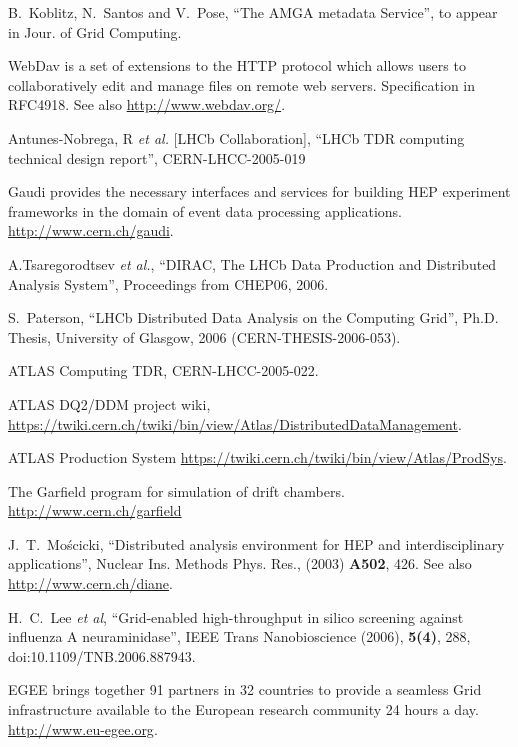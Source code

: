 \documentclass{elsart}
\begin{document}
\begin{thebibliography}{00}
 B.~Koblitz, N.~Santos and V.~Pose, ``The AMGA metadata
  Service'', to appear in Jour. of Grid Computing.

 WebDav is a set of extensions to the HTTP protocol which
  allows users to collaboratively edit and manage files on remote web servers.
  Specification in RFC4918. See also \url{http://www.webdav.org/}.

    Antunes-Nobrega, R {\it et al.} [LHCb Collaboration],
  ``LHCb TDR computing technical design report'', CERN-LHCC-2005-019

  Gaudi provides the necessary interfaces and services for building HEP
  experiment frameworks in the domain of event data processing
  applications. \url{http://www.cern.ch/gaudi}.

  A.Tsaregorodtsev {\it et al.}, ``DIRAC, The LHCb Data Production and
  Distributed Analysis System'', Proceedings from CHEP06, 2006.

  S.~Paterson, ``LHCb Distributed Data Analysis on the Computing Grid'', Ph.D.
  Thesis, University of Glasgow, 2006 (CERN-THESIS-2006-053).

  ATLAS Computing TDR, CERN-LHCC-2005-022.

  ATLAS DQ2/DDM project wiki, 
  \url{https://twiki.cern.ch/twiki/bin/view/Atlas/DistributedDataManagement}.

  ATLAS Production System
  \url{https://twiki.cern.ch/twiki/bin/view/Atlas/ProdSys}.

  The Garfield program for simulation of drift chambers.
  \url{http://www.cern.ch/garfield}

 J.~T.~Mo{\'s}cicki, ``Distributed analysis environment for
  HEP and interdisciplinary applications'', Nuclear Ins. Methods Phys. Res.,
  (2003) {\bf A502}, 426. See also
  \url{http://www.cern.ch/diane}.

  H.~C.~Lee {\it et al}, ``Grid-enabled high-throughput in silico screening
  against influenza A neuraminidase'', IEEE Trans Nanobioscience (2006), 
  {\bf 5(4)}, 288, doi:10.1109/TNB.2006.887943.

  EGEE brings together 91 partners in 32 countries to provide a seamless Grid
  infrastructure available to the European research community 24 hours a day.
  \url{http://www.eu-egee.org}.





\end{thebibliography}
\end{document}
